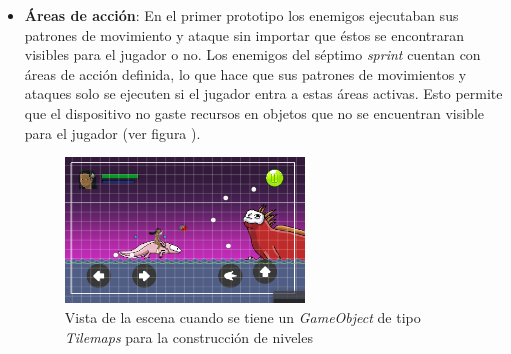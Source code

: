 	\begin{itemize}
		 \item \textbf{Áreas de acción}: En el primer prototipo los enemigos ejecutaban 
		 sus patrones de movimiento y ataque sin importar que éstos se encontraran 
		 visibles para el jugador o no. Los enemigos del séptimo \textit{sprint} 
		 cuentan con áreas de acción definida, lo que hace que sus patrones de 
		 movimientos y ataques solo se ejecuten si el jugador entra a estas áreas 
		 activas. Esto permite que el dispositivo no gaste recursos en objetos que no se 
		 encuentran visible para el jugador (ver figura ).
		 \begin{figure}[h]
    			\centering
    			\includegraphics[width=0.6\textwidth]{05TrabajoReali/imagenes/tilemaps01.png}
    			\caption{Vista de la escena cuando se tiene un \textit{GameObject} de 
    			tipo \textit{Tilemaps} para la construcción de niveles}
    			\label{fig:EnemyArea}
			\end{figure}
		   

\end{itemize}
